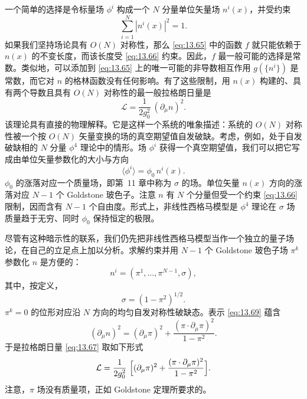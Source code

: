 一个简单的选择是令标量场 $\phi^i$ 构成一个 $N$ 分量单位矢量场 $n^i(x)$，并受约束
\begin{equation}
  \sum_{i=1}^{N} |n^i(x)|^2 = 1 .
  \label{eq:13.66}
\end{equation}
如果我们坚持场论具有 $O(N)$ 对称性，那么 \eqref{eq:13.65} 中的函数 $f$ 就只能依赖于 $n(x)$ 的不变长度，而该长度受 \eqref{eq:13.66} 约束。因此，$f$ 最一般可能的选择是常数。类似地，可以添加到 \eqref{eq:13.65} 上的唯一可能的非导数相互作用 $g(\{n^i\})$ 是常数，而它对 $n$ 的格林函数没有任何影响。有了这些限制，用 $n(x)$ 构建的、具有两个导数且具有 $O(N)$ 对称性的最一般拉格朗日量是
\begin{equation}
  \mathcal{L} = \frac{1}{2g_0^2}\ (\partial_\mu n)^2 .
  \label{eq:13.67}
\end{equation}
该理论具有直接的物理解释。它是这样一个系统的唯象描述：系统的 $O(N)$ 对称性被一个按 $O(N)$ 矢量变换的场的真空期望值自发破缺。考虑，例如，处于自发破缺相的 $N$ 分量 $\phi^4$ 理论中的情形。场 $\phi^i$ 获得一个真空期望值，我们可以把它写成由单位矢量参数化的大小与方向
\begin{equation}
  \langle\phi^i\rangle = \phi_0\,n^i(x) .
  \label{eq:13.68}
\end{equation}
$\phi_0$ 的涨落对应一个质量场，即第~11 章中称为 $\sigma$ 的场。单位矢量 $n(x)$ 方向的涨落对应 $N-1$ 个 Goldstone 玻色子。注意 $n$ 有 $N$ 个分量但受一个约束 \eqref{eq:13.66} 限制，因而含有 $N-1$ 个自由度。形式上，非线性西格马模型是 $\phi^4$ 理论在 $\sigma$ 场质量趋于无穷、同时 $\phi_0$ 保持恒定的极限。

尽管有这种暗示性的联系，我们仍先把非线性西格马模型当作一个独立的量子场论，在自己的立足点上加以分析。求解约束并用 $N-1$ 个 Goldstone 玻色子场 $\pi^k$ 参数化 $n$ 是方便的：
\begin{equation}
  n^i = (\pi^1, \ldots, \pi^{N-1}, \sigma) ,
  \label{eq:13.69}
\end{equation}
其中，按定义，
\begin{equation}
  \sigma = (1-\pi^2)^{1/2} .
  \label{eq:13.70}
\end{equation}
$\pi^k = 0$ 的位形对应沿 $N$ 方向的均匀自发对称性破缺态。表示 \eqref{eq:13.69} 蕴含
\begin{equation}
  (\partial_\mu n)^2 = (\partial_\mu\pi)^2 + \frac{(\pi\cdot\partial_\mu\pi)^2}
    {1-\pi^2} .
  \label{eq:13.71}
\end{equation}
于是拉格朗日量 \eqref{eq:13.67} 取如下形式
\begin{equation}
  \mathcal{L} = \frac{1}{2g_0^2}\ \Bigl[ (\partial_\mu\pi)^2
    + \frac{(\pi\cdot\partial_\mu\pi)^2}{1-\pi^2} \Bigr] .
  \label{eq:13.72}
\end{equation}
注意，$\pi$ 场没有质量项，正如 Goldstone 定理所要求的。


